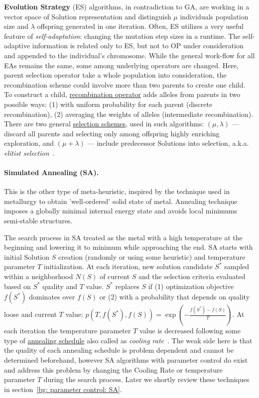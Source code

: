 \textbf{Evolution Strategy} (ES) algorithms, in contradiction to GA, are working in a vector space of Solution representation and distinguish \underline{$\mu$} individuals population size and \underline{$\lambda$} offspring generated in one iteration. Often, ES utilizes a very useful feature of \textit{self-adaptation}: changing the mutation step sizes in a runtime. The self-adaptive information is related only to ES, but not to OP under consideration and appended to the individual's chromosome. While the general work-flow for all EAs remains the same, some among underlying operators are changed. Here, parent selection operator take a whole population into consideration, the recombination scheme could involve more than two parents to create one child. To construct a child, \underline{recombination operator} adds alleles from parents in two possible ways: (1) with uniform probability for each parent (discrete recombination), (2) averaging the weights of alleles (intermediate recombination). There are two general \underline{selection schemes}, used in such algorithms: $(\mu,\lambda)$ — discard all parents and selecting only among offspring highly enriching exploration, and $(\mu+\lambda)$ — include predecessor Solutions into selection, a.k.a. \textit{elitist selection}~\cite{eiben2015popular}.

\paragraph{Simulated Annealing (SA).} This is the other type of meta-heuristic, inspired by the technique used in metallurgy to obtain 'well-ordered' solid state of metal. Annealing technique imposes a globally minimal internal energy state and avoids local minimums semi-stable structures. 

The search process in SA treated as the metal with a high temperature at the beginning and lowering it to minimum while approaching the end. %
SA starts with initial Solution $S$ creation (randomly or using some heuristic) and temperature parameter \underline{$T$} initialization. At each iteration, new solution candidate $S^*$ sampled within a neighborhood $N(S)$ of current $S$ and the selection criteria evaluated based on $S^*$ quality and $T$ value. $S^*$ replaces $S$ if (1) optimization objective $f(S^*)$ dominates over $f(S)$ or (2) with a probability that depends on quality loose and current $T$ value: $p(T, f(S^*), f(S)) = \exp(-\frac{f(S^*) - f(S)}{T})$. %
At each iteration the temperature parameter $T$ value is decreased following some type of \underline{annealing schedule} also called as \textit{cooling rate}~\cite{boussaid2013survey}. The weak side here is that the quality of each annealing schedule is problem dependent and cannot be determined beforehand, however SA algorithms with parameter control do exist and address this problem by changing the Cooling Rate or temperature parameter $T$ during the search process. Later we shortly review these techniques in section~\ref{bg: parameter control: SA}.


